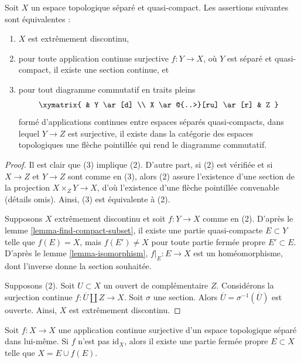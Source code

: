 \begin{proposition}
\label{proposition-projective-in-category-hausdorff-qc}
Soit $X$ un espace topologique séparé et quasi-compact.
Les assertions suivantes sont équivalentes :
\begin{enumerate}
\item $X$ est extrêmement discontinu,
\item pour toute application continue surjective $f : Y \to X$, où $Y$ est
séparé et quasi-compact, il existe une section continue, et
\item pour tout diagramme commutatif en traits pleins
$$
\xymatrix{
& Y \ar[d] \\
X \ar@{..>}[ru] \ar[r] & Z
}
$$
formé d'applications continues entre espaces séparés quasi-compacts, dans lequel
$Y \to Z$ est surjective, il existe dans la catégorie des espaces topologiques
une flèche pointillée qui rend le diagramme commutatif.
\end{enumerate}
\end{proposition}

\begin{proof}
Il est clair que (3) implique (2). D'autre part, si (2) est vérifiée et si
$X \to Z$ et $Y \to Z$ sont comme en (3), alors (2) assure l'existence d'une
section de la projection $X \times_Z Y \to X$, d'où l'existence d'une flèche
pointillée convenable (détails omis). Ainsi, (3) est équivalente à (2).

\medskip\noindent
Supposons $X$ extrêmement discontinu et soit $f : Y \to X$ comme en (2).
D'après le lemme \ref{lemma-find-compact-subset}, il existe une partie
quasi-compacte $E \subset Y$ telle que $f(E) = X$, mais
$f(E') \not = X$ pour toute partie fermée propre $E' \subset E$. D'après le
lemme \ref{lemma-isomorphism}, $f|_E : E \to X$ est un homéomorphisme, dont
l'inverse donne la section souhaitée.

\medskip\noindent
Supposons (2). Soit $U \subset X$ un ouvert de complémentaire $Z$.
Considérons la surjection continue $f : \overline{U} \amalg Z \to X$.
Soit $\sigma$ une section. Alors $\overline{U} = \sigma^{-1}(\overline{U})$
est ouverte. Ainsi, $X$ est extrêmement discontinu.
\end{proof}

\begin{lemma}
\label{lemma-rainwater}
Soit $f : X \to X$ une application continue surjective d'un espace
topologique séparé dans lui-même. Si $f$ n'est pas $\text{id}_X$, alors il
existe une partie fermée propre $E \subset X$ telle que $X = E \cup f(E)$.
\end{lemma}

